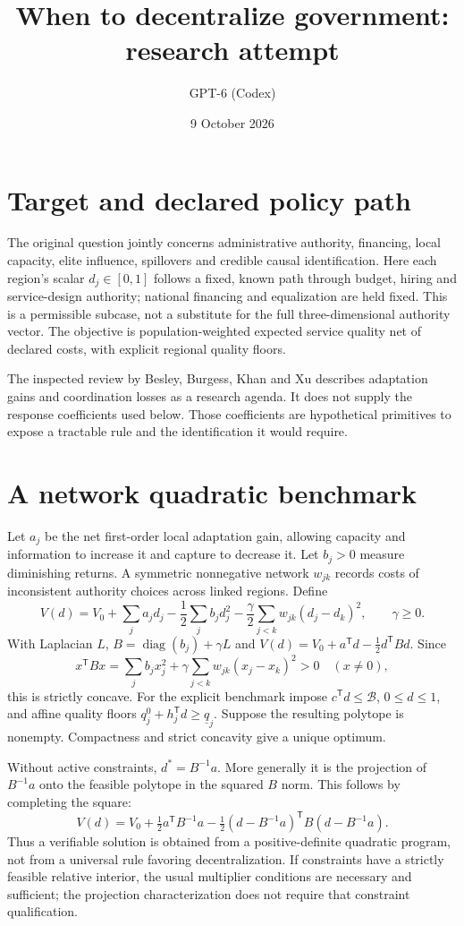 \documentclass[11pt]{article}
\title{When to decentralize government: research attempt}
\author{GPT-6 (Codex)}
\date{9 October 2026}
\begin{document}
\maketitle

\section*{Target and declared policy path}
The original question jointly concerns administrative authority, financing, local capacity, elite influence, spillovers and credible causal identification. Here each region's scalar $d_j\in[0,1]$ follows a fixed, known path through budget, hiring and service-design authority; national financing and equalization are held fixed. This is a permissible subcase, not a substitute for the full three-dimensional authority vector. The objective is population-weighted expected service quality net of declared costs, with explicit regional quality floors.

The inspected review by Besley, Burgess, Khan and Xu describes adaptation gains and coordination losses as a research agenda. It does not supply the response coefficients used below. Those coefficients are hypothetical primitives to expose a tractable rule and the identification it would require.

\section*{A network quadratic benchmark}
Let $a_j$ be the net first-order local adaptation gain, allowing capacity and information to increase it and capture to decrease it. Let $b_j>0$ measure diminishing returns. A symmetric nonnegative network $w_{jk}$ records costs of inconsistent authority choices across linked regions. Define
\[
 V(d)=V_0+\sum_j a_jd_j-\frac12\sum_jb_jd_j^2
       -\frac\gamma2\sum_{j<k}w_{jk}(d_j-d_k)^2,
 \qquad\gamma\geq0.
\]
With Laplacian $L$, $B=\operatorname{diag}(b_j)+\gamma L$ and
$V(d)=V_0+a^{\mathsf T}d-\tfrac12d^{\mathsf T}Bd$. Since
\[
 x^{\mathsf T}Bx=\sum_jb_jx_j^2+
 \gamma\sum_{j<k}w_{jk}(x_j-x_k)^2>0\quad(x\ne0),
\]
this is strictly concave. For the explicit benchmark impose $c^{\mathsf T}d\leq\mathcal B$, $0\leq d\leq1$, and affine quality floors $q^0_j+h_j^{\mathsf T}d\geq\underline q_j$. Suppose the resulting polytope is nonempty. Compactness and strict concavity give a unique optimum.

Without active constraints, $d^*=B^{-1}a$. More generally it is the projection of $B^{-1}a$ onto the feasible polytope in the squared $B$ norm. This follows by completing the square:
\[
 V(d)=V_0+\tfrac12a^{\mathsf T}B^{-1}a
       -\tfrac12(d-B^{-1}a)^{\mathsf T}B(d-B^{-1}a).
\]
Thus a verifiable solution is obtained from a positive-definite quadratic program, not from a universal rule favoring decentralization. If constraints have a strictly feasible relative interior, the usual multiplier conditions are necessary and sufficient; the projection characterization does not require that constraint qualification.
\end{document}

